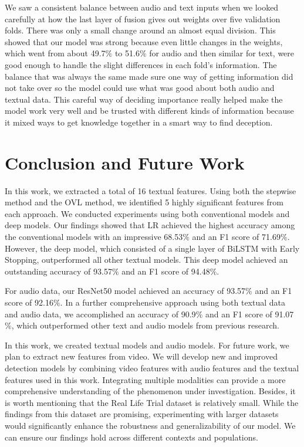 \documentclass[12pt]{article}
\begin{document}
We saw a consistent balance between audio and text inputs when we looked carefully at how the last layer of fusion gives out weights over five validation folds. There was only a small change around an almost equal division. This showed that our model was strong because even little changes in the weights, which went from about 49.7$\%$ to 51.6$\%$ for audio and then similar for text, were good enough to handle the slight differences in each fold's information. The balance that was always the same made sure one way of getting information did not take over so the model could use what was good about both audio and textual data. This careful way of deciding importance really helped make the model work very well and be trusted with different kinds of information because it mixed ways to get knowledge together in a smart way to find deception.
\section{Conclusion and Future Work}
\label{sec:conclusion}
In this work, we extracted a total of 16 textual features. Using both the stepwise method and the OVL method, we identified 5 highly significant features from each approach. We conducted experiments using both conventional models and deep models. Our findings showed that LR achieved the highest accuracy among the conventional models with an impressive 68.53$\%$ and an F1 score of 71.69$\%$. However, the deep model, which consisted of a single layer of BiLSTM with Early Stopping, outperformed all other textual models. This deep model achieved an outstanding accuracy of 93.57$\%$ and an F1 score of 94.48$\%$. 
  
For audio data, our ResNet50 model achieved an accuracy of 93.57$\%$ and an F1 score of 92.16$\%$. In a further comprehensive approach using both textual data and audio data, we accomplished an accuracy of 90.9$\%$ and an F1 score of 91.07$\%$, which outperformed other text and audio models from previous research.

In this work, we created textual models and audio models. For future work, we plan to extract new features from video. We will develop new and improved detection models by combining video features with audio features and the textual features used in this work. Integrating multiple modalities can provide a more comprehensive understanding of the phenomenon under investigation. Besides, it is worth mentioning that the Real Life Trial dataset is relatively small. While the findings from this dataset are promising, experimenting with larger datasets would significantly enhance the robustness and generalizability of our model. We can ensure our findings hold across different contexts and populations.
\newpage
\end{document}
